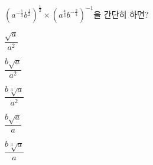 $(a^{-\frac{1}{3}}b^{\frac{1}{2}})^{\frac{1}{2}}\times(a^{\frac{4}{3}}b^{-\frac{3}{4}})^{-1}$을 간단히 하면? 
\begin{choices32}{\rule[-3ex]{0pt}{8ex}$\dfrac{\sqrt{a}}{a^2}$}{\rule[-3ex]{0pt}{8ex}$\dfrac{b\sqrt{a}}{a^2}$}{\rule[-3ex]{0pt}{8ex}$\dfrac{b\sqrt[3]{a}}{a^2}$}{\rule[-3ex]{0pt}{8ex}$\dfrac{b\sqrt{a}}{a}$}{\rule[-3ex]{0pt}{8ex}$\dfrac{b\sqrt[3]{a}}{a}$}\end{choices32}

